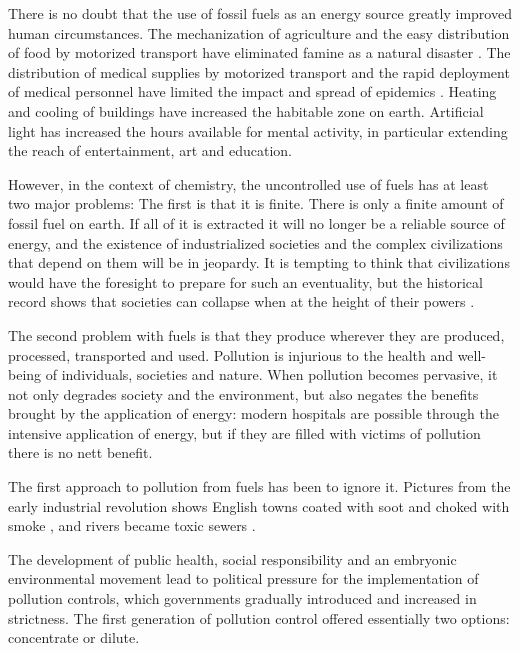 There is no doubt that the use of fossil fuels as an energy source greatly
improved human circumstances. The mechanization of agriculture and the easy
distribution of food by motorized transport have eliminated famine as a natural
disaster \autocite{DeAngelis2007}. The distribution of medical supplies by
motorized transport and the rapid deployment of medical personnel have limited
the impact and spread of epidemics \autocite{Ministere2018}. Heating and cooling
of buildings have increased the habitable zone on earth. Artificial light has
increased the hours available for mental activity, in particular extending the
reach of entertainment, art and education.

However, in the context of chemistry, the uncontrolled use of fuels has at least
two major problems: The first is that it is finite. There is only a finite
amount of fossil fuel on earth. If all of it is extracted it will no longer be a
reliable source of energy, and the existence of industrialized societies and the
complex civilizations that depend on them will be in jeopardy. It is tempting to
think that civilizations would have the foresight to prepare for such an
eventuality, but the historical record shows that societies can collapse when at
the height of their powers \autocite{Diamond2006}.

The second problem with fuels is that they produce  wherever
they are produced, processed, transported and used. Pollution is injurious to
the health and well-being of individuals, societies and nature. When pollution
becomes pervasive, it not only degrades society and the environment, but also
negates the benefits brought by the application of energy: modern hospitals are
possible through the intensive application of energy, but if they are filled
with victims of pollution there is no nett benefit.

The first approach to pollution from fuels has been to ignore it. Pictures
from the early industrial revolution shows English towns coated with soot and
choked with smoke \autocite{Flick1980}, and rivers became toxic
sewers \autocite{Halliday2001}.

The development of public health, social responsibility \autocite{Szreter2003}
and an embryonic environmental movement \autocite{Williams1965} lead to
political pressure for the implementation of pollution controls, which
governments gradually introduced and increased in strictness. The first
generation of pollution control offered essentially two options:
concentrate or dilute.

